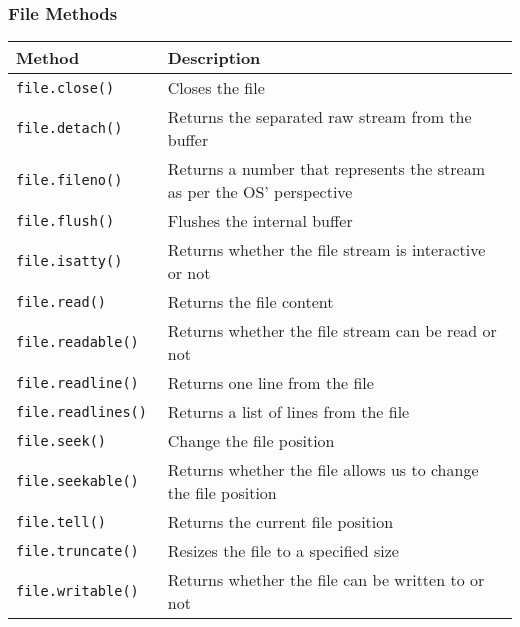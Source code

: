 \documentclass[aspectratio=1610]{beamer}
\begin{document}
\begin{frame}
    \frametitle{File Methods}
    \begin{table}[!htbp]
    	\centering
        \small
    	\begin{tabular}{ll}
    		\toprule \toprule
    		Method                     & Description                                                                          \\
    		\midrule
    		\texttt{file.close()     } & Closes the file                                                                      \\
    		\texttt{file.detach()    } & Returns the separated raw stream from the buffer                                     \\
    		\texttt{file.fileno()    } & Returns a number that represents the stream as per the OS' perspective               \\
    		\texttt{file.flush()     } & Flushes the internal buffer                                                          \\
    		\texttt{file.isatty()    } & Returns whether the file stream is interactive or not                                \\
    		\texttt{file.read()      } & Returns the file content                                                             \\
    		\texttt{file.readable()  } & Returns whether the file stream can be read or not                                   \\
    		\texttt{file.readline()  } & Returns one line from the file                                                       \\
    		\texttt{file.readlines() } & Returns a list of lines from the file                                                \\
    		\texttt{file.seek()      } & Change the file position                                                             \\
    		\texttt{file.seekable()  } & Returns whether the file allows us to change the file position                       \\
    		\texttt{file.tell()      } & Returns the current file position                                                    \\
    		\texttt{file.truncate()  } & Resizes the file to a specified size                                                 \\
    		\texttt{file.writable()  } & Returns whether the file can be written to or not                                    \\

\end{tabular}
\end{table}
\end{frame}
\end{document}

